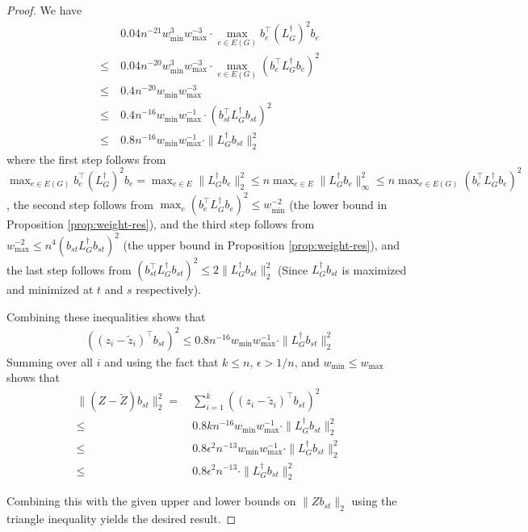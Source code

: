 \begin{proof}
We have
\begin{align*}
& ~ 0.04 n^{-21} w_{\min}^3 w_{\max}^{-3} \cdot \max_{e\in E(G)} b_e^\top (L_G^{\dagger})^2 b_e \\
\le & ~ 0.04 n^{-20} w_{\min}^3 w_{\max}^{-3} \cdot \max_{e\in E(G)} (b_e^\top L_G^{\dagger} b_e)^2\\
\le & ~ 0.4 n^{-20} w_{\min} w_{\max}^{-3}\\
\le & ~ 0.4 n^{-16} w_{\min} w_{\max}^{-1} \cdot (b_{st}^\top L_G^{\dagger} b_{st})^2 \\
\le & ~ 0.8 n^{-16} w_{\min} w_{\max}^{-1} \cdot \| L_G^\dagger b_{st} \|_2^2
\end{align*}
where the first step follows from $\max_{e \in E(G)} b_e^\top (L_G^\dagger)^2 b_e = \max_{e\in E} \| L_G^\dagger b_e \|_2^2 \leq n \max_{e\in E} \| L_G^\dagger b_e \|_{\infty}^2 \leq n \max_{e \in E(G)} ( b_e^\top L_G^\dagger b_e )^2$, the second step follows from $\max_e (b_e^\top L_G^\dagger b_e)^2 \leq w_{\min}^{-2}$ (the lower bound in Proposition \ref{prop:weight-res}), and the third step follows from $w_{\max}^{-2} \leq n^4 (b_{st} L_G^\dagger b_{st})^2$ (the upper bound in Proposition \ref{prop:weight-res}), and the last step follows from $(b_{st}^\top L_G^{\dagger} b_{st})^2 \le 2 \| L_G^\dagger b_{st} \|_2^2$ (Since $L_G^{\dagger} b_{st}$ is maximized and minimized at $t$ and $s$ respectively).

Combining these inequalities shows that
\begin{align*}
((z_i - \tilde{z}_i)^\top b_{st})^2\le 0.8 n^{-16} w_{\min}w_{\max}^{-1} \cdot \|L_G^{\dagger}b_{st}\|_2^2
\end{align*}
Summing over all $i$ and using the fact that $k\le n$, $\epsilon > 1/n$, and $w_{\min}\le w_{\max}$ shows that
\begin{align*}
    \|(Z - \tilde{Z})b_{st}\|_2^2
    = & ~ \sum_{i=1}^k ((z_i - \tilde{z}_i)^\top b_{st})^2\\
    \leq & ~ 0.8 k n^{-16} w_{\min}w_{\max}^{-1} \cdot \|L_G^{\dagger}b_{st}\|_2^2 \\
    \leq & ~ 0.8 \epsilon^2 n^{-13} w_{\min} w_{\max}^{-1} \cdot \|L_G^{\dagger}b_{st}\|_2^2 ~ \\
    \le & ~ 0.8 \epsilon^2 n^{-13} \cdot \|L_G^{\dagger} b_{st}\|_2^2
\end{align*}


Combining this with the given upper and lower bounds on $\| Z b_{st} \|_2$ using the triangle inequality yields the desired result.
\end{proof}

